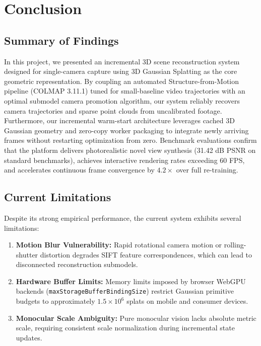 \documentclass[conference]{IEEEtran}
\begin{document}
\section{Conclusion}
\subsection{Summary of Findings}
In this project, we presented an incremental 3D scene reconstruction system designed for single-camera capture using 3D Gaussian Splatting as the core geometric representation. By coupling an automated Structure-from-Motion pipeline (COLMAP 3.11.1) tuned for small-baseline video trajectories with an optimal submodel camera promotion algorithm, our system reliably recovers camera trajectories and sparse point clouds from uncalibrated footage. Furthermore, our incremental warm-start architecture leverages cached 3D Gaussian geometry and zero-copy worker packaging to integrate newly arriving frames without restarting optimization from zero. Benchmark evaluations confirm that the platform delivers photorealistic novel view synthesis (31.42 dB PSNR on standard benchmarks), achieves interactive rendering rates exceeding 60 FPS, and accelerates continuous frame convergence by $4.2\times$ over full re-training.

\subsection{Current Limitations}
Despite its strong empirical performance, the current system exhibits several limitations:
\begin{enumerate}
    \item \textbf{Motion Blur Vulnerability:} Rapid rotational camera motion or rolling-shutter distortion degrades SIFT feature correspondences, which can lead to disconnected reconstruction submodels.
    \item \textbf{Hardware Buffer Limits:} Memory limits imposed by browser WebGPU backends (\texttt{maxStorageBufferBindingSize}) restrict Gaussian primitive budgets to approximately $1.5 \times 10^6$ splats on mobile and consumer devices.
    \item \textbf{Monocular Scale Ambiguity:} Pure monocular vision lacks absolute metric scale, requiring consistent scale normalization during incremental state updates.
\end{enumerate}
\end{document}
